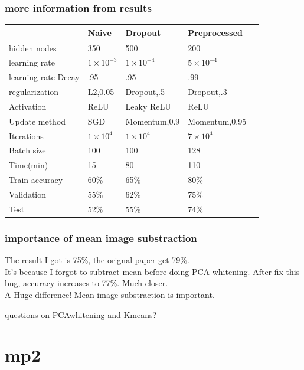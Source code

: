 \documentclass{beamer}
\begin{document}
\begin{frame}
\frametitle{more information from results}
    \begin{table}
    	\centering
    	\begin{tabular}{lllll}
    	\toprule
				& Naive & Dropout & Preprocessed & \\
				\midrule
	  hidden nodes    & 350   & 500        & 200 & \\
	  learning rate & $1\times10^{-3}$   & $1\times10^{-4}$       & $5\times10^{-4}$ &  \\
	  learning rate Decay & .95   & .95       & .99 &  \\
	  regularization & L2,0.05  & Dropout,.5       & Dropout,.3 &  \\
	  Activation  & ReLU  & Leaky ReLU       & ReLU &  \\
	  Update method  & SGD  & Momentum,0.9       & Momentum,0.95   &  \\
	  Iterations & $1\times10^{4}$  & $1\times10^{4}$       & $7\times10^{4}$ &  \\    		
	  Batch size & 100  & 100       & 128 &  \\    		
	  Time(min)  & 15  & 80       & 110 &     		\\
	  Train accuracy  & 60\%  & 65\%       & 80\% & \\
			Validation  & 55\%  & 62\%       & 75\% &     	\\	
    		Test  & 52\%  & 55\%       & 74\% &     		
    	\end{tabular}
    \end{table}
\end{frame}

\begin{frame}
\frametitle{importance of mean image substraction}
The result I got is 75\%, the orignal paper get 79\%. \\
It's because I forgot to subtract mean before doing PCA whitening. 
After fix this bug, accuracy increases to 77\%. Much closer. \\ \phantom 
A Huge difference! Mean image substraction is important.
\end{frame}

\begin{frame}
\begin{huge}\centerline{questions on PCAwhitening and Kmeans?}\end{huge}
\end{frame}
\section{mp2}
\begin{frame}
\tableofcontents
\end{frame}
\end{document}
